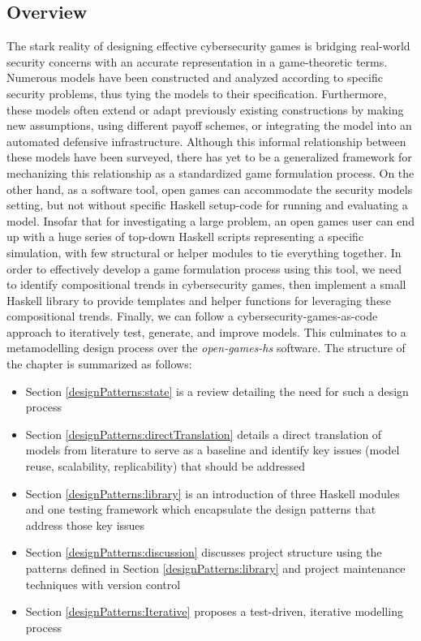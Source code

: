 \documentclass[11pt,titlepage,dvipsnames,table,xcdraw,english]{article}
\begin{document}
\subsection{Overview}

The stark reality of designing effective cybersecurity games is bridging real-world security concerns with an accurate representation in a game-theoretic terms. Numerous models have been constructed and analyzed according to specific security problems, thus tying the models to their specification. Furthermore, these models often extend or adapt previously existing constructions by making new assumptions, using different payoff schemes, or integrating the model into an automated defensive infrastructure. Although this informal relationship between these models have been surveyed, there has yet to be a generalized framework for mechanizing this relationship as a standardized game formulation process. On the other hand, as a software tool, open games can accommodate the security models setting, but not without specific Haskell setup-code for running and evaluating a model. Insofar that for investigating a large problem, an open games user can end up with a huge series of top-down Haskell scripts representing a specific simulation, with few structural or helper modules to tie everything together. In order to effectively develop a game formulation process using this tool, we need to identify compositional trends in cybersecurity games, then implement a small Haskell library to provide templates and helper functions for leveraging these compositional trends. Finally, we can follow a cybersecurity-games-as-code approach to iteratively test, generate, and improve models.
This culminates to a metamodelling design process over the \textit{open-games-hs} software. The structure of the chapter is summarized as follows: 
\begin{itemize}
	\item Section \ref{designPatterns:state} is a review detailing the need for such a design process
	\item Section \ref{designPatterns:directTranslation} details a direct translation of models from literature to serve as a baseline and identify key issues (model reuse, scalability, replicability) that should be addressed 
	\item Section \ref{designPatterns:library} is an introduction of three Haskell modules and one testing framework which encapsulate the design patterns that address those key issues 
	\item Section \ref{designPatterns:discussion} discusses project structure using the patterns defined in Section \ref{designPatterns:library} and project maintenance techniques with version control
	\item Section \ref{designPatterns:Iterative} proposes a test-driven, iterative modelling process
\end{itemize}
\end{document}

